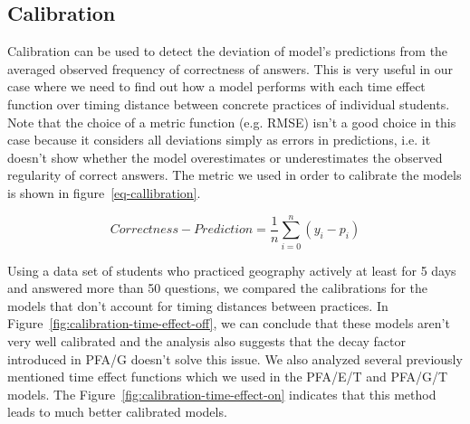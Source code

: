 \subsection{Calibration}
\label{memory-calibration}

Calibration can be used to detect the deviation of model's predictions from the averaged observed frequency of correctness of answers. This is very useful in our case where we need to find out how a model performs with each time effect function over timing distance between concrete practices of individual students. Note that the choice of a metric function (e.g. RMSE) isn't a good choice in this case because it considers all deviations simply as errors in predictions, i.e. it doesn't show whether the model overestimates or underestimates the observed regularity of correct answers. The metric we used in order to calibrate the models is shown in figure~\ref{eq-callibration}.

\begin{equation} \label{eq-callibration}
  \mathit{Correctness} - \mathit{Prediction} = \frac{1}{n} \sum_{i=0}^{n} (y_i - p_i)
\end{equation}

Using a data set of students who practiced geography actively at least for 5 days and answered more than 50 questions, we compared the calibrations for the models that don't account for timing distances between practices. In Figure~\ref{fig:calibration-time-effect-off}, we can conclude that these models aren't very well calibrated and the analysis also suggests that the decay factor introduced in PFA/G doesn't solve this issue. We also analyzed several previously mentioned time effect functions which we used in the PFA/E/T and PFA/G/T models. The Figure~\ref{fig:calibration-time-effect-on} indicates that this method leads to much better calibrated models.


